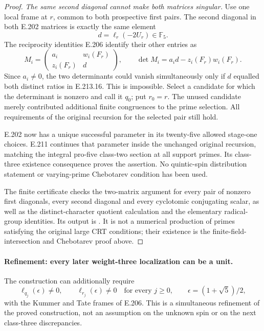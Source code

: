 \begin{proof}
\emph{The same second diagonal cannot make both matrices singular.}
Use one local frame at $r$, common to both prospective
first pairs. The second diagonal in both E.202 matrices
is exactly the same element
\[
                         d=\ell_r(-2U_r)\in\mathbb F_5.
 \tag{E.213.17}
\]
The reciprocity identities E.206 identify their other
entries as
\[
 M_i=
 \begin{pmatrix}
 a_i&w_i(F_r)\\ z_i(F_r)&d
 \end{pmatrix},
 \qquad
 \det M_i=a_i d-z_i(F_r)w_i(F_r).
 \tag{E.213.18}
\]
Since $a_i\ne0$, the two determinants could vanish
simultaneously only if $d$ equalled both distinct ratios
in E.213.16. This is impossible. Select a candidate for
which the determinant is nonzero and call it $q_0$;
put $r_0=r$. The unused candidate merely contributed
additional finite congruences to the prime selection.
All requirements of the original recursion for the
selected pair still hold.

E.202 now has a unique successful parameter in its
twenty-five allowed stage-one choices. E.211 continues
that parameter inside the unchanged original recursion,
matching the integral pro-five class-two section at all
support primes. Its class-three existence consequence
proves the assertion. No quintic-spin distribution
statement or varying-prime Chebotarev condition has been
used.

The finite certificate
 checks the
two-matrix argument for every pair of nonzero first
diagonals, every second diagonal and every cyclotomic
conjugating scalar, as well as the distinct-character
quotient calculation and the elementary radical-group
identities. Its output is
.
It is not a numerical production of primes satisfying
the original large CRT conditions; their existence is
the finite-field-intersection and Chebotarev proof above.
\end{proof}

\paragraph{Refinement: every later weight-three localization can be a unit.}
The construction can additionally require
\[
 \ell_{q_j}(\epsilon)\ne0,\qquad
 \ell_{r_j}(\epsilon)\ne0
 \quad\text{for every }j\ge0,\qquad
 \epsilon=(1+\sqrt5)/2,
 \tag{E.213.19}
\]
with the Kummer and Tate frames of E.206.
This is a simultaneous refinement of the proved construction,
not an assumption on the unknown spin or on the next
class-three discrepancies.

